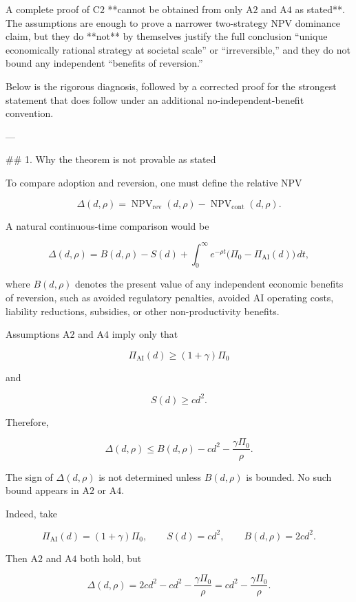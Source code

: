 A complete proof of \(\mathrm{C2}\) **cannot be obtained from only \(\mathrm{A2}\) and \(\mathrm{A4}\) as stated**. The assumptions are enough to prove a narrower two-strategy NPV dominance claim, but they do **not** by themselves justify the full conclusion “unique economically rational strategy at societal scale” or “irreversible,” and they do not bound any independent “benefits of reversion.”

Below is the rigorous diagnosis, followed by a corrected proof for the strongest statement that does follow under an additional no-independent-benefit convention.

---

## 1. Why the theorem is not provable as stated

To compare adoption and reversion, one must define the relative NPV

\[
\Delta(d,\rho)
=
\operatorname{NPV}_{\mathrm{rev}}(d,\rho)
-
\operatorname{NPV}_{\mathrm{cont}}(d,\rho).
\]

A natural continuous-time comparison would be

\[
\Delta(d,\rho)
=
B(d,\rho)
-
S(d)
+
\int_{0}^{\infty} e^{-\rho t}
\bigl(\Pi_0-\Pi_{\mathrm{AI}}(d)\bigr)\,dt,
\]

where \(B(d,\rho)\) denotes the present value of any independent economic benefits of reversion, such as avoided regulatory penalties, avoided AI operating costs, liability reductions, subsidies, or other non-productivity benefits.

Assumptions \(\mathrm{A2}\) and \(\mathrm{A4}\) imply only that

\[
\Pi_{\mathrm{AI}}(d)\ge (1+\gamma)\Pi_0
\]

and

\[
S(d)\ge c d^2.
\]

Therefore,

\[
\Delta(d,\rho)
\le
B(d,\rho)
-
c d^2
-
\frac{\gamma \Pi_0}{\rho}.
\]

The sign of \(\Delta(d,\rho)\) is not determined unless \(B(d,\rho)\) is bounded. No such bound appears in \(\mathrm{A2}\) or \(\mathrm{A4}\).

Indeed, take

\[
\Pi_{\mathrm{AI}}(d)=(1+\gamma)\Pi_0,
\qquad
S(d)=c d^2,
\qquad
B(d,\rho)=2c d^2.
\]

Then \(\mathrm{A2}\) and \(\mathrm{A4}\) both hold, but

\[
\Delta(d,\rho)
=
2c d^2
-
c d^2
-
\frac{\gamma \Pi_0}{\rho}
=
c d^2
-
\frac{\gamma \Pi_0}{\rho}.
\]

